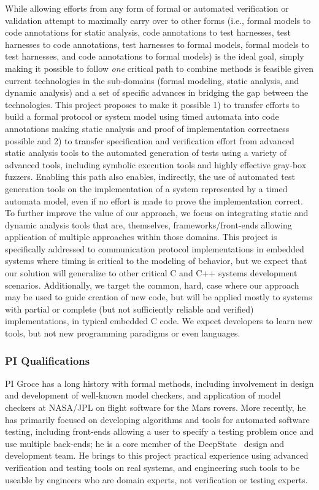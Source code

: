 While allowing efforts from any form of formal or automated verification or validation attempt to maximally carry over to other forms (i.e., formal models to code annotations for static analysis, code annotations to test harnesses, test harnesses to code annotations, test harnesses to formal models, formal models to test harnesses, and code annotations to formal models) is the ideal goal, simply making it possible to follow \emph{one} critical path to combine methods is feasible given current technologies in the sub-domains (formal modeling, static analysis, and dynamic analysis) and a set of specific advances in bridging the gap between the technologies.  This project proposes to make it possible 1) to transfer efforts to build a formal protocol or system model using timed automata into code annotations making static analysis and proof of implementation correctness possible and 2) to transfer specification and verification effort from advanced static analysis tools to the automated generation of tests using a variety of advanced tools, including symbolic execution tools and highly effective gray-box fuzzers.  Enabling this path also enables, indirectly, the use of automated test generation tools on the implementation of a system represented by a timed automata model, even if no effort is made to prove the implementation correct.  To further improve the value of our approach, we focus on integrating static and dynamic analysis tools that are, themselves, frameworks/front-ends allowing application of multiple approaches within those domains.  This project is specifically addressed to communication protocol implementations in embedded systems where timing is critical to the modeling of behavior, but we expect that our solution will generalize to other critical C and C++ systems development scenarios.  Additionally, we target the common, hard, case where our approach may be used to guide creation of new code, but will be applied mostly to systems with partial or complete (but not sufficiently reliable and verified) implementations, in typical embedded C code.  We expect developers to learn new tools, but not new programming paradigms or even languages.

\subsubsection{PI Qualifications}

PI Groce has a long history with formal methods, including involvement in design and development of well-known model checkers, and application of model checkers at NASA/JPL on flight software for the Mars rovers.  More recently, he has primarily focused on developing algorithms and tools for automated software testing, including front-ends allowing a user to specify a testing problem once and use multiple back-ends; he is a core member of the DeepState~\cite{DeepState,deepstatetutorial,deepstaterepo} design and development team.  He brings to this project practical experience using advanced verification and testing tools on real systems, and engineering such tools to be useable by engineers who are domain experts, not verification or testing experts.

